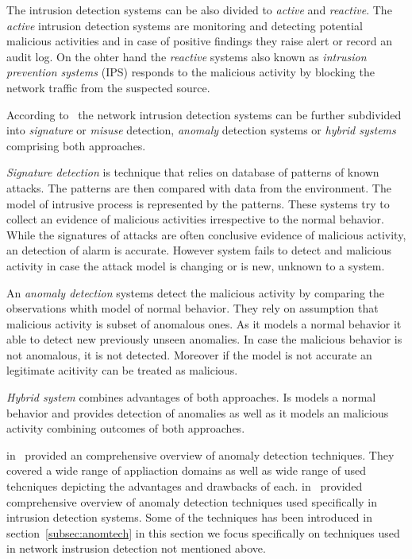 The intrusion detection systems can be also divided to \emph{active} and \emph{reactive}. 
The \emph{active} intrusion detection systems are monitoring
and detecting potential malicious activities and in case of positive findings they raise alert or record an audit log.
On the ohter hand the \emph{reactive} systems also known as \emph{intrusion prevention systems} (IPS)
responds to the malicious activity by blocking the network traffic from the suspected source.

According to~\cite{patcha2007anomaly} the network intrusion detection systems can be further subdivided into 
\emph{signature} or \emph{misuse} detection,
\emph{anomaly} detection systems or \emph{hybrid systems} comprising both approaches.

\emph{Signature detection} is technique that relies on database of patterns of known attacks. 
The patterns are then compared with  data from the environment. The model of intrusive process is represented by
the patterns. These systems try to collect an evidence of malicious activities irrespective to the 
normal behavior. While the signatures of attacks are often conclusive evidence of malicious activity,
an detection of alarm is accurate. However system fails to detect and malicious activity in case the attack
model is changing or is new, unknown to a system.

An \emph{anomaly detection} systems detect the malicious activity by comparing the observations whith model of normal
behavior. They rely on assumption that malicious activity is subset of anomalous ones. As it models a normal behavior
it able to detect new previously unseen anomalies. In case the malicious behavior is not anomalous, it is not detected.
Moreover if the model is not accurate an legitimate acitivity can be treated as malicious. 

\emph{Hybrid system} combines advantages of both approaches. Is models a normal behavior and provides
detection of anomalies as well as it models an malicious activity combining outcomes of both approaches.

 in~\cite{chandola2009anomaly} provided an comprehensive overview of anomaly detection
techniques. They covered a wide range of appliaction domains as well as wide range of used tehcniques 
depicting the advantages and drawbacks of each.  in~\cite{patcha2007anomaly}
provided comprehensive overview of anomaly detection techniques used specifically in intrusion detection systems. 
Some of the techniques has been introduced in section~\ref{subsec:anomtech} in this section we focus specifically
on techniques used in network instrusion detection not mentioned above.
